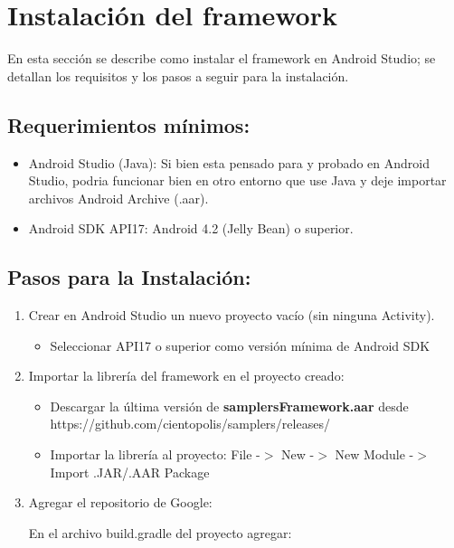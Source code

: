 \chapter{Instalación del framework} \label{sec:instalacion}
En esta sección se describe como instalar el framework en Android Studio; se detallan los requisitos y los pasos a seguir para la instalación.

\section{Requerimientos mínimos:}

\begin{itemize}
\item Android Studio (Java): Si bien esta pensado para y probado en Android Studio, podria funcionar bien en otro entorno que use Java y deje importar archivos Android Archive (.aar).
\item Android SDK API17: Android 4.2 (Jelly Bean) o superior.
\end{itemize}

\section{Pasos para la Instalación:}

\begin{enumerate}
	\item Crear en Android Studio un nuevo proyecto vacío (sin ninguna Activity).
		\begin{itemize}
		\item Seleccionar API17 o superior como versión mínima de Android SDK
		\end{itemize}
		
		
	\item Importar la librería del framework en el proyecto creado:
		\begin{itemize}
		\item Descargar la última versión de \textbf{samplersFramework.aar} desde https://github.com/cientopolis/samplers/releases/
		\item Importar la librería al proyecto: File -$>$ New -$>$ New Module -$>$ Import .JAR/.AAR Package
		\end{itemize}
		
\clearpage		
		
	\item Agregar el repositorio de Google:
	
		En el archivo build.gradle del proyecto agregar: 
\end{enumerate}	
		
